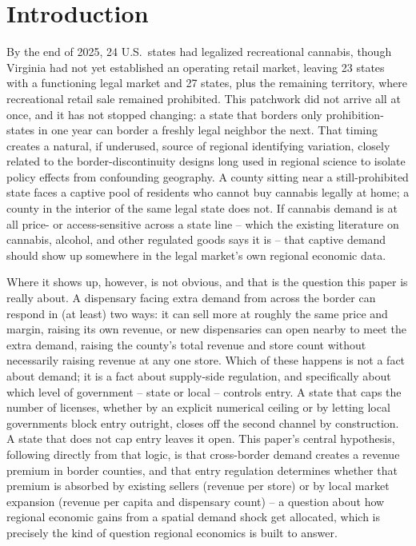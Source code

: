 \documentclass[12pt]{article}
\begin{document}
\section{Introduction}
\label{sec:intro}

By the end of 2025, 24 U.S.\ states had legalized recreational cannabis, though Virginia had not yet
established an operating retail market, leaving 23 states with a functioning legal market and 27 states,
plus the remaining territory, where recreational retail sale remained prohibited. This patchwork did not
arrive all at once, and it has not stopped changing: a state that borders only prohibition-states in one year
can border a freshly legal neighbor the next. That timing creates a natural, if underused, source of regional
identifying variation, closely related to the border-discontinuity designs long used in regional science to
isolate policy effects from confounding geography. A county sitting near a still-prohibited state faces a
captive pool of residents who cannot buy cannabis legally at home; a county in the interior of the same legal
state does not. If cannabis demand is at all price- or access-sensitive across a state line -- which the
existing literature on cannabis, alcohol, and other regulated goods says it is -- that captive demand should
show up somewhere in the legal market's own regional economic data.

Where it shows up, however, is not obvious, and that is the question this paper is really about. A dispensary
facing extra demand from across the border can respond in (at least) two ways: it can sell more at roughly the
same price and margin, raising its own revenue, or new dispensaries can open nearby to meet the extra demand,
raising the county's total revenue and store count without necessarily raising revenue at any one store. Which
of these happens is not a fact about demand; it is a fact about supply-side regulation, and specifically about
which level of government -- state or local -- controls entry. A state that caps the number of licenses,
whether by an explicit numerical ceiling or by letting local governments block entry outright, closes off the
second channel by construction. A state that does not cap entry leaves it open. This paper's central
hypothesis, following directly from that logic, is that cross-border demand creates a revenue premium in
border counties, and that entry regulation determines whether that premium is absorbed by existing sellers
(revenue per store) or by local market expansion (revenue per capita and dispensary count) -- a question about
how regional economic gains from a spatial demand shock get allocated, which is precisely the kind of question
regional economics is built to answer.
\end{document}
